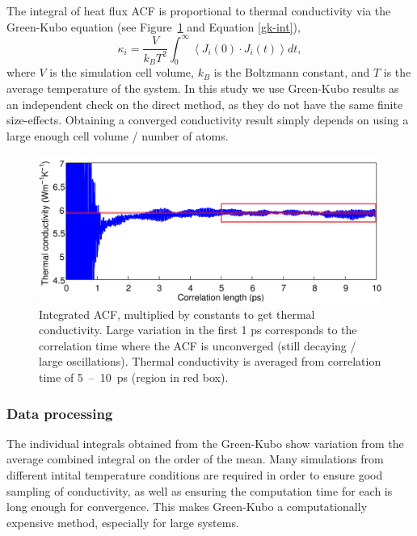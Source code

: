 The integral of heat flux ACF is proportional to thermal conductivity via the Green-Kubo equation (see Figure~\ref{fig:gk_int} and Equation \ref{gk-int}), 
%
\begin{equation}
\kappa_i = \frac{V}{k_{B}T^{2}} \int_{0}^{\infty} \left \langle J_i(0) \cdot  J_i(t) \right \rangle dt ,
\label{gk-int}
\end{equation}
%
where $V$ is the simulation cell volume, $k_B$ is the Boltzmann constant, and $T$ is the average temperature of the system. In this study we use Green-Kubo results as an independent check on the direct method, as they do not have the same finite size-effects. Obtaining a converged conductivity result simply depends on using a large enough cell volume / number of atoms. 

\begin{figure}[h]
\includegraphics[width=\linewidth]{Figures/gk_int.png}
\caption{Integrated ACF, multiplied by constants to get thermal conductivity. Large variation in the first 1 ps corresponds to the correlation time where the ACF is unconverged (still decaying / large oscillations). Thermal conductivity is averaged from correlation time of 5~--~10~ps (region in red box).}
\label{fig:gk_int}
\end{figure}



\subsubsection{Data processing}

The individual integrals obtained from the Green-Kubo show variation from the average combined integral on the order of the mean. Many simulations from different intital temperature conditions are required in order to ensure good sampling of conductivity, as well as ensuring the computation time for each is long enough for convergence. This makes Green-Kubo a computationally expensive method, especially for large systems.


